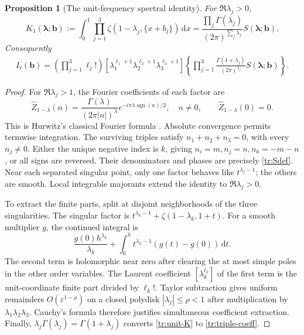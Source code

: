 \documentclass[11pt,a4paper]{article}
\numberwithin{equation}{section}
\newtheorem{proposition}[theorem]{Proposition}
\theoremstyle{definition}
\theoremstyle{remark}
\DeclareMathOperator{\sgn}{sgn}
\newcommand{\dd}{\,\mathrm d}
\newcommand{\eps}{\varepsilon}
\begin{document}
\begin{proposition}[The unit-frequency spectral identity]
\label{tr:unit-spectral}
For $\Re\lambda_j>0$,
\begin{equation}\label{tr:unit-K}
 K_1(\boldsymbol\lambda;\boldsymbol b)
 :=\int_0^1\prod_{j=1}^3\zeta(1-\lambda_j,\{x+b_j\})\dd x
  =\frac{\prod_j\Gamma(\lambda_j)}{(2\pi)^{\sum_j\lambda_j}}
       S(\boldsymbol\lambda;\boldsymbol b).
\end{equation}
Consequently
\begin{align}\label{tr:triple-coeff}
 I_{\boldsymbol\ell}(\boldsymbol b)
 =\left(\prod_{j=1}^3\ell_j!\right)
 [\lambda_1^{\ell_1+1}\lambda_2^{\ell_2+1}\lambda_3^{\ell_3+1}]
 \left\{\prod_{j=1}^3\frac{\Gamma(1+\lambda_j)}{(2\pi)^{\lambda_j}}
 S(\boldsymbol\lambda;\boldsymbol b)\right\}.
\end{align}
\end{proposition}
\begin{proof}
For $\Re\lambda_j>1$, the Fourier coefficients of each factor are
\[
 \widehat Z_{1-\lambda}(n)
  =\frac{\Gamma(\lambda)}{(2\pi|n|)^\lambda}
       e^{-i\pi\lambda\sgn(n)/2},\quad n\ne0,
 \qquad \widehat Z_{1-\lambda}(0)=0.
\]
This is Hurwitz's classical Fourier formula
\cite[Eq.~25.11.9]{dlmf-hurwitz}. Absolute convergence permits
termwise integration. The surviving triples satisfy
$n_1+n_2+n_3=0$, with every $n_j\ne0$. Either the unique negative
index is $k$, giving $n_i=m,n_j=n,n_k=-m-n$, or all signs are
reversed. Their denominators and phases are precisely
\eqref{tr:Sdef}. Near each separated singular point, only one factor
behaves like $t^{\lambda_j-1}$; the others are smooth. Local integrable
majorants extend the identity to $\Re\lambda_j>0$.

To extract the finite parts, split at disjoint neighborhoods of the
three singularities. The singular factor is
$t^{\lambda_k-1}+\zeta(1-\lambda_k,1+t)$. For a smooth multiplier
$g$, the continued integral is
\[
 \frac{g(0)h^{\lambda_k}}{\lambda_k}
 +\int_0^h t^{\lambda_k-1}(g(t)-g(0))\dd t.
\]
The second term is holomorphic near zero after clearing the at most
simple poles in the other order variables. The Laurent coefficient
$[\lambda_k^{\ell_k}]$ of the first term is the unit-coordinate
finite part divided by $\ell_k!$. Taylor subtraction gives uniform
remainders $O(\eps^{1-\rho})$ on a closed polydisk
$|\lambda_j|\leq\rho<1$ after multiplication by
$\lambda_1\lambda_2\lambda_3$. Cauchy's formula therefore justifies
simultaneous coefficient extraction. Finally,
$\lambda_j\Gamma(\lambda_j)=\Gamma(1+\lambda_j)$ converts
\eqref{tr:unit-K} to \eqref{tr:triple-coeff}.
\end{proof}
\end{document}

